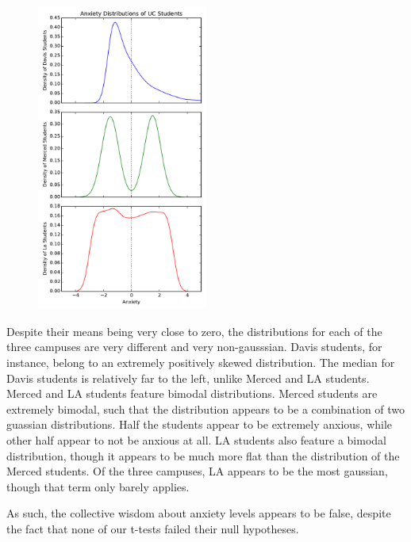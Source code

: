 \documentclass[onecolumn,10pt]{jhwhw}
\begin{document}
\begin{figure}
  \begin{center}
    \includegraphics[width=0.5\textwidth]{figures/problem5.pdf}
  \end{center}
\end{figure}

Despite their means being very close to zero, the distributions for each of the three campuses are very different and very non-gausssian. Davis students, for instance, belong to an extremely positively skewed distribution. The median for Davis students is relatively far to the left, unlike Merced and LA students. Merced and LA students feature bimodal distributions. Merced students are extremely bimodal, such that the distribution appears to be a combination of two guassian distributions. Half the students appear to be extremely anxious, while other half appear to not be anxious at all. LA students also feature a bimodal distribution, though it appears to be much more flat than the distribution of the Merced students. Of the three campuses, LA appears to be the most gaussian, though that term only barely applies.

As such, the collective wisdom about anxiety levels appears to be false, despite the fact that none of our t-tests failed their null hypotheses.
\end{document}
